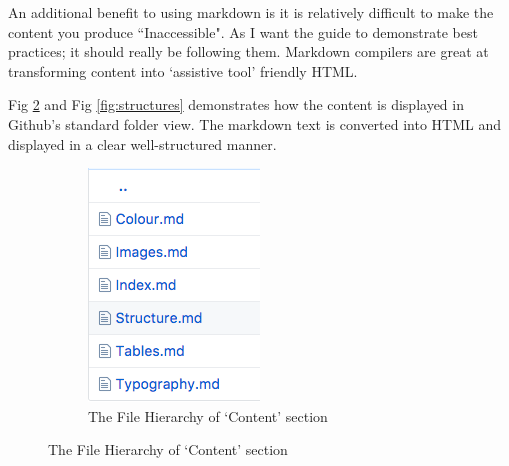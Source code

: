 An additional benefit to using markdown is it is relatively difficult to make
the content you produce ``Inaccessible". As I want the guide to demonstrate
best practices; it should really be following them. Markdown compilers are
great at transforming content into `assistive tool' friendly HTML.

Fig \ref{fig:hierarchy} and Fig \ref{fig:structures} demonstrates how the
content is displayed in Github's standard folder view. The markdown text is
converted into HTML and displayed in a clear well-structured manner.

\begin{figure}[H]
    \centering
    \begin{subfigure}[b]{0.25\textwidth}
        \includegraphics[width=\textwidth]{figures/documentation_md_example_1}
        \captionsetup{justification=centering}
        \caption{The File Hierarchy of `Content' section}
        \label{fig:hierarchy}
    \end{subfigure}

\end{figure}
